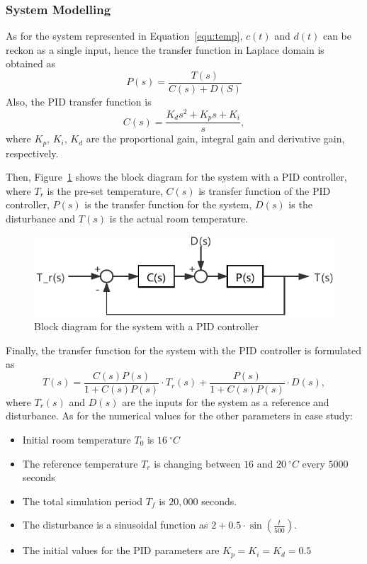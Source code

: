 \documentclass[11pt,oneside,onecolumn,openright]{article}
\begin{document}
  \subsubsection{System Modelling}
  As for the system represented in Equation~\eqref{equ:temp}, $c(t)$ and $d(t)$ can be reckon as a single input, hence the transfer function in Laplace domain is obtained as 
    \begin{equation}
  P(s)=\frac{T(s)}{C(s)+D(S)}
  \end{equation}
  Also, the PID transfer function is 
  \begin{equation}
  C(s)=\frac{K_{d} s^{2}+K_{p} s+K_{i}}{s},
  \end{equation}
  where $K_p$, $K_i$, $K_d$ are the proportional gain, integral gain and derivative gain, respectively.

  Then, Figure~\ref{fig:block} shows the block diagram for the system with a PID controller, where $T_r$ is the pre-set temperature, $C(s)$ is transfer function of the PID controller, $P(s)$ is the transfer function for the system, $D(s)$ is the disturbance and $T(s)$ is the actual room temperature.
    \begin{figure}[H]
    \centering
    \includegraphics[width=13cm]{fig/block.pdf}
    \caption{Block diagram for the system with a PID controller}
    \label{fig:block}
    \end{figure}
  Finally, the transfer function for the system with the PID controller is formulated as
  \begin{equation}\label{equ:allsys}
  T(s)=\frac{C(s)P(s)}{1+C(s)P(s)}\cdot T_r(s) +\frac{P(s)}{1+C(s)P(s)}\cdot D(s),
  \end{equation}
  where $T_r(s)$ and $D(s)$ are the inputs for the system as a reference and disturbance. As for the numerical values for the other parameters in case study:
  \begin{itemize}
    \item Initial room temperature $T_0$ is $16\ ^\circ C$
    \item The reference temperature $T_r$ is changing between $16$ and $20\ ^\circ C$ every $5000$ seconds
    \item The total simulation period $T_f$ is $20,000$ seconds.
    \item The disturbance is a sinusoidal function as $2+0.5 \cdot \sin(\frac{t}{500})$.
    \item The initial values for the PID parameters are $K_p=K_i=K_d=0.5$
  \end{itemize}
\end{document}

